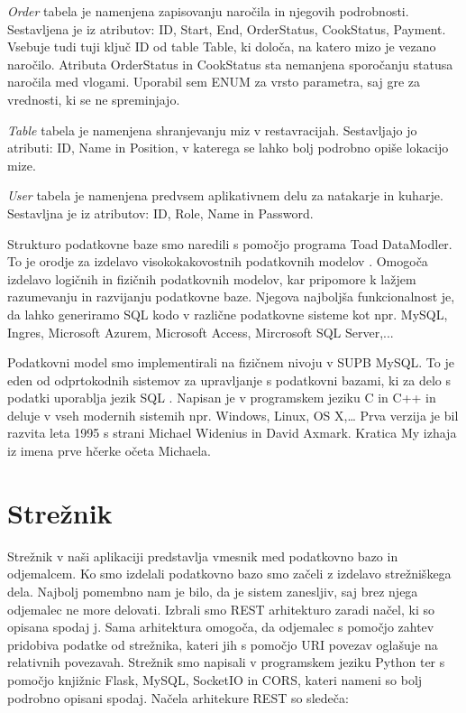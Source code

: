 \documentclass[a4paper, 12pt]{book}
\begin{document}
\textit{Order} tabela je namenjena zapisovanju naročila in njegovih podrobnosti. Sestavljena je iz atributov: ID, Start, End, OrderStatus, CookStatus, Payment. Vsebuje tudi tuji ključ ID od table Table, ki določa, na katero mizo je vezano naročilo. Atributa OrderStatus in CookStatus sta nemanjena sporočanju statusa naročila med vlogami. Uporabil sem ENUM za vrsto parametra, saj gre za vrednosti, ki se ne spreminjajo.

\textit{Table} tabela je namenjena shranjevanju miz v restavracijah. Sestavljajo jo atributi: ID, Name in Position, v katerega se lahko bolj podrobno opiše lokacijo mize.

\textit{User} tabela je namenjena predvsem aplikativnem delu za natakarje in kuharje. Sestavljna je iz atributov: ID, Role, Name in Password. 

Strukturo podatkovne baze smo naredili s pomočjo programa Toad DataModler. To je orodje za izdelavo visokokakovostnih podatkovnih modelov \cite{Toad_Data_Modeler}. Omogoča izdelavo logičnih in fizičnih podatkovnih modelov, kar pripomore k lažjem razumevanju in razvijanju podatkovne baze. Njegova najboljša funkcionalnost je, da lahko generiramo SQL kodo v različne podatkovne sisteme kot npr. MySQL, Ingres, Microsoft Azurem, Microsoft Access, Mircrosoft SQL Server,... 

Podatkovni model smo implementirali na fizičnem nivoju v SUPB MySQL. To je eden od odprtokodnih sistemov za upravljanje s podatkovni bazami, ki za delo s podatki uporablja jezik SQL \cite{MySQL}. Napisan je v programskem jeziku C in C++ in deluje v vseh modernih sistemih npr. Windows, Linux, OS X,… Prva verzija je bil razvita leta 1995 s strani Michael Widenius in David Axmark. Kratica My izhaja iz imena prve hčerke očeta Michaela.  


\section{Strežnik}
Strežnik v naši aplikaciji predstavlja vmesnik med podatkovno bazo in odjemalcem. Ko smo izdelali podatkovno bazo smo začeli z izdelavo strežniškega dela. Najbolj pomembno nam je bilo, da je sistem zanesljiv, saj brez njega odjemalec ne more delovati. Izbrali smo REST arhitekturo zaradi načel, ki so opisana spodaj \cite{RESTAPI}j. Sama arhitektura omogoča, da odjemalec s pomočjo zahtev pridobiva podatke od strežnika, kateri jih s pomočjo URI povezav oglašuje na relativnih povezavah.  Strežnik smo napisali v programskem jeziku Python ter s pomočjo knjižnic Flask, MySQL, SocketIO in CORS, kateri nameni so bolj podrobno opisani spodaj. Načela arhitekure REST so sledeča:
\end{document}

